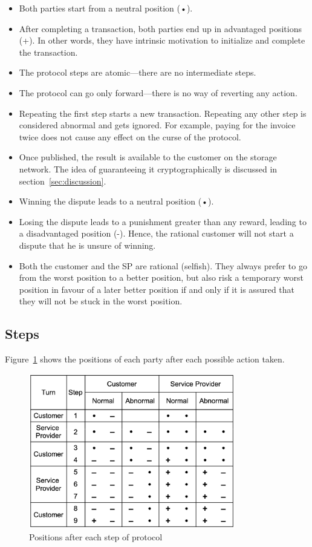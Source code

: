 \documentclass{ieeeaccess}
\begin{document}
\begin{itemize}

\item
    Both parties start from a neutral position (•).
\item
    After completing a transaction, both parties end up in advantaged positions (+). In other words, they have intrinsic motivation to initialize and complete the transaction.
\item
    The protocol steps are atomic—there are no intermediate steps.
\item 
    The protocol can go only forward—there is no way of reverting any action.
\item
    Repeating the first step starts a new transaction. Repeating any other step is considered abnormal and gets ignored. For example, paying for the invoice twice does not cause any effect on the curse of the protocol.
\item 
    Once published, the result is available to the customer on the storage network. The idea of guaranteeing it cryptographically is discussed in section~\ref{sec:discussion}.
    
\item
    Winning the dispute leads to a neutral position (•).

\item
    Losing the dispute leads to a punishment greater than any reward, leading to a disadvantaged position (-). Hence, the rational customer will not start a dispute that he is unsure of winning.
\item
    Both the customer and the SP are rational (selfish). They always prefer to go from the worst position to a better position, but also risk a temporary worst position in favour of a later better position if and only if it is assured that they will not be stuck in the worst position.
\end{itemize}

\subsection{Steps}\label{sec:steps}

Figure~\ref{fig:positions} shows the positions of each party after each possible action taken.

\begin{figure}[h!]
\includegraphics[width=9cm]{formal-table-of-positions.png}
\centering
\caption{Positions after each step of protocol}
\label{fig:positions}
\end{figure}
\end{document}
